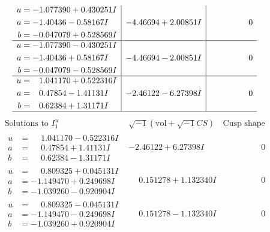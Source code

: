 \documentclass[1p]{elsarticle_modified}
\theoremstyle{definition}
\newcommand{\I}{\sqrt{-1}}
\begin{document}
$$\begin{array}{c|c|c}
\begin{aligned}
u &= -1.077390 + 0.430251 I \\
a &= -1.40436 - 0.58167 I \\
b &= -0.047079 + 0.528569 I\end{aligned}
 & -4.46694 + 2.00851 I & \phantom{-0.000000 } 0 \\ \hline\begin{aligned}
u &= -1.077390 - 0.430251 I \\
a &= -1.40436 + 0.58167 I \\
b &= -0.047079 - 0.528569 I\end{aligned}
 & -4.46694 - 2.00851 I & \phantom{-0.000000 } 0 \\ \hline\begin{aligned}
u &= \phantom{-}1.041170 + 0.522316 I \\
a &= \phantom{-}0.47854 - 1.41131 I \\
b &= \phantom{-}0.62384 + 1.31171 I\end{aligned}
 & -2.46122 - 6.27398 I & \phantom{-0.000000 } 0\\
 \hline 
 \end{array}$$\newpage$$\begin{array}{c|c|c}  
\text{Solutions to }I^u_{1}& \I (\text{vol} + \sqrt{-1}CS) & \text{Cusp shape}\\
 \hline 
\begin{aligned}
u &= \phantom{-}1.041170 - 0.522316 I \\
a &= \phantom{-}0.47854 + 1.41131 I \\
b &= \phantom{-}0.62384 - 1.31171 I\end{aligned}
 & -2.46122 + 6.27398 I & \phantom{-0.000000 } 0 \\ \hline\begin{aligned}
u &= \phantom{-}0.809325 + 0.045131 I \\
a &= -1.149470 + 0.249698 I \\
b &= -1.039260 - 0.920904 I\end{aligned}
 & \phantom{-}0.151278 + 1.132340 I & \phantom{-0.000000 } 0 \\ \hline\begin{aligned}
u &= \phantom{-}0.809325 - 0.045131 I \\
a &= -1.149470 - 0.249698 I \\
b &= -1.039260 + 0.920904 I\end{aligned}
 & \phantom{-}0.151278 - 1.132340 I & \phantom{-0.000000 } 0 \\ \hline\begin{aligned}

\end{aligned}
\end{array}$$
\end{document}
